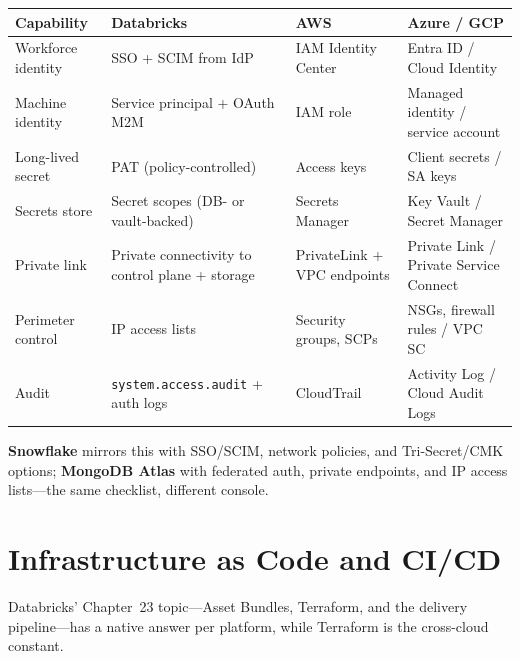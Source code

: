 \begin{center}
\footnotesize
\begin{tabular}{@{}p{3.0cm}p{3.4cm}p{3.2cm}p{3.2cm}@{}}
\toprule
\textbf{Capability} & \textbf{Databricks} & \textbf{AWS} & \textbf{Azure / GCP} \\
\midrule
Workforce identity & SSO + SCIM from IdP & IAM Identity Center & Entra ID / Cloud Identity \\
Machine identity & Service principal + OAuth M2M & IAM role & Managed identity / service account \\
Long-lived secret & PAT (policy-controlled) & Access keys & Client secrets / SA keys \\
Secrets store & Secret scopes (DB- or vault-backed) & Secrets Manager & Key Vault / Secret Manager \\
Private link & Private connectivity to control plane + storage & PrivateLink + VPC endpoints & Private Link / Private Service Connect \\
Perimeter control & IP access lists & Security groups, SCPs & NSGs, firewall rules / VPC SC \\
Audit & \texttt{system.access.audit} + auth logs & CloudTrail & Activity Log / Cloud Audit Logs \\
\bottomrule
\end{tabular}
\end{center}

\noindent \textbf{Snowflake} mirrors this with SSO/SCIM, network policies, and
Tri-Secret/CMK options; \textbf{MongoDB Atlas} with federated auth, private endpoints, and
IP access lists---the same checklist, different console.

\section{Infrastructure as Code and CI/CD}
%
Databricks' Chapter~23 topic---Asset Bundles, Terraform, and the delivery pipeline---has a
native answer per platform, while Terraform is the cross-cloud constant.


